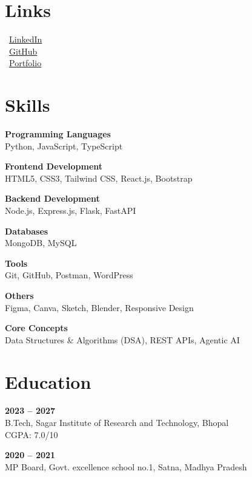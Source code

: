 \documentclass[a4paper,10pt]{article}
\begin{document}
\begin{minipage}[t]{0.33\textwidth}
\raggedright

\section*{Links}
\faLinkedin\ \href{https://www.linkedin.com/in/explore-abhishek-sing/}{LinkedIn} \\
\faGithub\ \href{https://github.com/Abhisheksinghcs27}{GitHub} \\
\faGlobe\ \href{src/assets/resume.pdf}{Portfolio}

\section*{Skills}
\textbf{Programming Languages}\\
Python, JavaScript, TypeScript

\vspace{1mm}
\textbf{Frontend Development}\\
HTML5, CSS3, Tailwind CSS, React.js, Bootstrap

\vspace{1mm}
\textbf{Backend Development}\\
Node.js, Express.js, Flask, FastAPI

\vspace{1mm}
\textbf{Databases}\\
MongoDB, MySQL

\vspace{1mm}
\textbf{Tools}\\
Git, GitHub, Postman, WordPress

\vspace{1mm}
\textbf{Others}\\
Figma, Canva, Sketch, Blender, Responsive Design

\vspace{1mm}
\textbf{Core Concepts}\\
Data Structures \& Algorithms (DSA), REST APIs, Agentic AI

\section*{Education}
\textbf{2023 -- 2027} \\
B.Tech, Sagar Institute of Research and Technology, Bhopal \\
CGPA: 7.0/10

\vspace{1mm}
\textbf{2020 -- 2021} \\
MP Board, Govt. excellence school no.1, Satna, Madhya Pradesh


\end{minipage}
\end{document}
